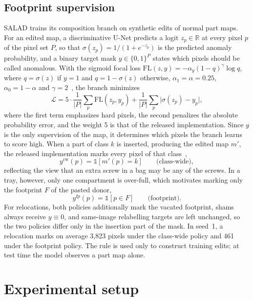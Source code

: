 \documentclass[10pt,twocolumn,letterpaper]{article}
\begin{document}
\subsection{Footprint supervision}
\label{sec:targets}
SALAD trains its composition branch on synthetic edits of normal part maps. For an edited map, a discriminative U-Net predicts a logit $z_p\in\mathbb{R}$ at every pixel $p$ of the pixel set $P$, so that $\sigma(z_p)=1/(1+e^{-z_p})$ is the predicted anomaly probability, and a binary target mask $y\in\{0,1\}^{P}$ states which pixels should be called anomalous. With the sigmoid focal loss $\mathrm{FL}(z,y)=-\alpha_y(1-q)^{\gamma}\log q$, where $q=\sigma(z)$ if $y=1$ and $q=1-\sigma(z)$ otherwise, $\alpha_1=\alpha=0.25$, $\alpha_0=1-\alpha$ and $\gamma=2$~\cite{lin2017focal}, the branch minimizes
\begin{equation}
 \mathcal{L}=5\cdot\frac{1}{|P|}\sum_p \mathrm{FL}(z_p,y_p)+\frac{1}{|P|}\sum_p\bigl|\sigma(z_p)-y_p\bigr|,
 \label{eq:loss}
\end{equation}
where the first term emphasizes hard pixels, the second penalizes the absolute probability error, and the weight 5 is that of the released implementation. Since $y$ is the only supervision of the map, it determines which pixels the branch learns to score high. When a part of class $k$ is inserted, producing the edited map $m'$, the released implementation marks every pixel of that class~\cite{fucka2025},
\begin{equation}
 y^{\text{cw}}(p)=\mathbb{1}[m'(p)=k]\qquad\text{(class-wide)},
\end{equation}
reflecting the view that an extra screw in a bag may be any of the screws. In a tray, however, only one compartment is over-full, which motivates marking only the footprint $F$ of the pasted donor,
\begin{equation}
 y^{\text{fp}}(p)=\mathbb{1}[p\in F]\qquad\text{(footprint)}.
\end{equation}
For relocations, both policies additionally mark the vacated footprint, shams always receive $y\equiv0$, and same-image relabelling targets are left unchanged, so the two policies differ only in the insertion part of the mask. In seed~1, a relocation marks on average 3,823 pixels under the class-wide policy and 461 under the footprint policy. The rule is used only to construct training edits; at test time the model observes a part map alone.

\section{Experimental setup}
\label{sec:setup}
\end{document}
